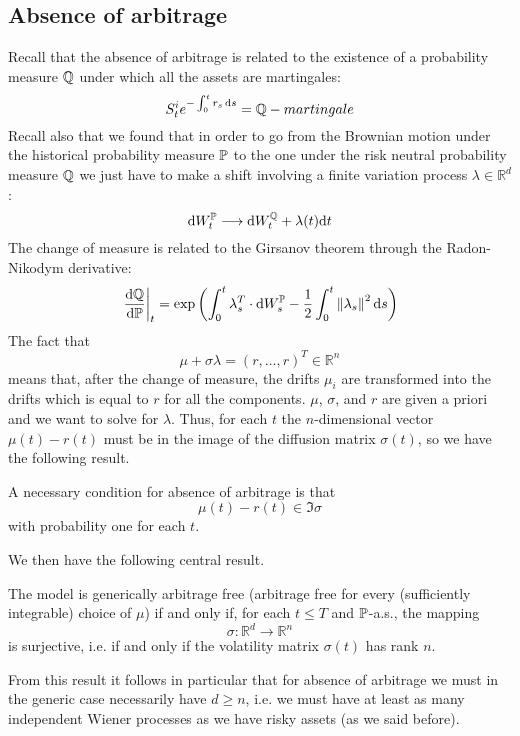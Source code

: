 \subsection{Absence of arbitrage}
Recall that the absence of arbitrage is related to the existence of a probability measure $\mathbb{Q}$ under which all the assets are martingales:
\begin{equation*}
    S^i_t e^{-\int_0^t r_s\,\dd s} = \mathbb{Q}-martingale
\end{equation*}
Recall also that we found that in order to go from the Brownian motion under the historical probability measure $\mathbb{P}$ to the one under the risk neutral probability measure $\mathbb{Q}$ we just have to make a shift involving a finite variation process $\lambda\in\mathbb{R}^d$:
\begin{equation*}
    \dd W_t^{\mathbb{P}} \longrightarrow \dd W_t^{\mathbb{Q}} + \lambda(t)\dd t
\end{equation*}
The change of measure is related to the Girsanov theorem through the Radon-Nikodym derivative:
\begin{equation}
    \eval{\dv{\mathbb{Q}}{\mathbb{P}}}_t = \exp\left(\int^t_0 \lambda_s^T\cdot\dd W_s^{\mathbb{P}}-\dfrac{1}{2}\int^t_0 \norm{\lambda_s}^2\,\dd s\right)
\end{equation}
The fact that
\begin{equation}\label{159}
    \mu + \sigma\lambda = (r,\dots,r)^T \in \mathbb{R}^n
\end{equation}
means that, after the change of measure, the drifts $\mu_i$ are transformed into the drifts which is equal to $r$ for all the components. $\mu$, $\sigma$, and $r$ are given a priori and we want to solve for $\lambda$. Thus, for each $t$ the $n$-dimensional vector $\mu(t)-r(t)$ must be in the image of the diffusion matrix $\sigma(t)$, so we have the following result.
\begin{proposition}
    A necessary condition for absence of arbitrage is that
    \begin{equation}
        \mu(t) - r(t) \in \Im{\sigma}
    \end{equation}
    with probability one for each $t$.
\end{proposition}
We then have the following central result.
\begin{proposition}
    The model is generically arbitrage free (arbitrage free for every (sufficiently integrable) choice of $\mu$) if and only if, for each $t\le T$ and $\mathbb{P}$-a.s., the mapping
    \begin{equation}
        \sigma: \mathbb{R}^d \to \mathbb{R}^n
    \end{equation}
    is surjective, i.e. if and only if the volatility matrix $\sigma(t)$ has rank $n$.
\end{proposition}
From this result it follows in particular that for absence of arbitrage we must in the generic case necessarily have $d\ge n$, i.e. we must have at least as many independent Wiener processes as we have risky assets (as we said before).

